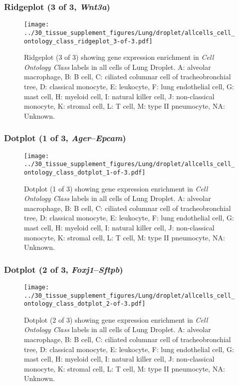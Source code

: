 \clearpage

\subsubsection{Ridgeplot (3 of 3, \emph{Wnt3a})}
\begin{figure}[h]
\centering
\texttt{[image: ../30\_tissue\_supplement\_figures/Lung/droplet/allcells\_cell\_ontology\_class\_ridgeplot\_3-of-3.pdf]}

\caption{ Ridgeplot (3 of 3)  showing gene expression enrichment in \emph{Cell Ontology Class} labels in all cells of Lung Droplet. A: alveolar macrophage, B: B cell, C: ciliated columnar cell of tracheobronchial tree, D: classical monocyte, E: leukocyte, F: lung endothelial cell, G: mast cell, H: myeloid cell, I: natural killer cell, J: non-classical monocyte, K: stromal cell, L: T cell, M: type II pneumocyte, NA: Unknown.}
\end{figure}


\clearpage

\subsubsection{Dotplot (1 of 3, \emph{Ager}--\emph{Epcam})}
\begin{figure}[h]
\centering
\texttt{[image: ../30\_tissue\_supplement\_figures/Lung/droplet/allcells\_cell\_ontology\_class\_dotplot\_1-of-3.pdf]}

\caption{ Dotplot (1 of 3)  showing gene expression enrichment in \emph{Cell Ontology Class} labels in all cells of Lung Droplet. A: alveolar macrophage, B: B cell, C: ciliated columnar cell of tracheobronchial tree, D: classical monocyte, E: leukocyte, F: lung endothelial cell, G: mast cell, H: myeloid cell, I: natural killer cell, J: non-classical monocyte, K: stromal cell, L: T cell, M: type II pneumocyte, NA: Unknown.}
\end{figure}


\clearpage

\subsubsection{Dotplot (2 of 3, \emph{Foxj1}--\emph{Sftpb})}
\begin{figure}[h]
\centering
\texttt{[image: ../30\_tissue\_supplement\_figures/Lung/droplet/allcells\_cell\_ontology\_class\_dotplot\_2-of-3.pdf]}

\caption{ Dotplot (2 of 3)  showing gene expression enrichment in \emph{Cell Ontology Class} labels in all cells of Lung Droplet. A: alveolar macrophage, B: B cell, C: ciliated columnar cell of tracheobronchial tree, D: classical monocyte, E: leukocyte, F: lung endothelial cell, G: mast cell, H: myeloid cell, I: natural killer cell, J: non-classical monocyte, K: stromal cell, L: T cell, M: type II pneumocyte, NA: Unknown.}
\end{figure}



